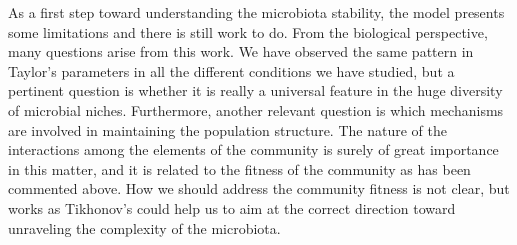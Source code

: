 As a first step toward understanding the microbiota stability, the model presents some limitations and there is still work to do. From the biological perspective, many questions arise from this work. We have observed the same pattern in Taylor's parameters in all the different conditions we have studied, but a pertinent question is whether it is really a universal feature in the huge diversity of microbial niches. Furthermore, another relevant question is which mechanisms are involved in maintaining the population structure. The nature of the interactions among the elements of the community is surely of great importance in this matter, and it is related to the fitness of the community as has been commented above. How we should address the community fitness is not clear, but works as Tikhonov's \cite{tikhonov} could help us to aim at the correct direction toward unraveling the complexity of the microbiota.